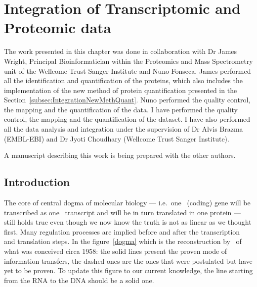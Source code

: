 \chapter{Integration of Transcriptomic and Proteomic data}

The work presented in this chapter was done in collaboration with Dr James Wright,
Principal Bioinformatician within the Proteomics and Mass Spectrometry unit of the
Wellcome Trust Sanger Institute and Nuno Fonseca. James performed all the
identification and quantification of the proteins, which also includes the
implementation of the new method of protein quantification presented in the
Section~\ref{subsec:IntegrationNewMethQuant}. Nuno performed the quality
control, the mapping and the quantification of the  data.
I have performed the quality control, the mapping and the quantification of the
 dataset. I have also performed
all the data analysis and integration under the supervision of Dr Alvis Brazma
(EMBL-EBI) and Dr Jyoti Choudhary (Wellcome Trust Sanger Institute).

A manuscript describing this work is being prepared with the other authors.

\section{Introduction}
\label{sec:IntegrationIntro}
%
%


The core of central dogma of molecular biology --- i.e.\ one \DNA\ (coding) gene will
be transcribed as one \mRNA\ transcript and will be in turn translated in one
protein --- still holds true even though we now know the truth is not as linear as
we thought first. Many regulation processes are implied before
and after the transcription and translation steps.
In the figure~\ref{dogma} which is the reconstruction by~\cite{Crick:1958} of
what was conceived circa 1958: the solid lines present the proven mode of information
transfers, the dashed ones are the ones that were postulated but have yet to be proven.
To update this figure to our current knowledge, the line starting from the RNA to
the DNA should be a solid one.

